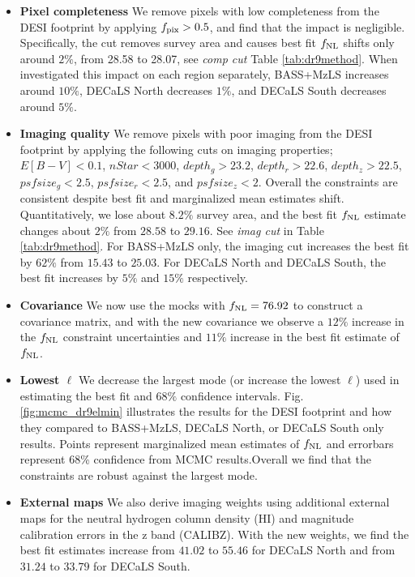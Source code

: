 \begin{itemize}
\item \textbf{Pixel completeness}
We remove pixels with low completeness from the DESI footprint by applying $f_{\rm pix}>0.5$, and find that the impact is negligible. Specifically, the cut removes  survey area and causes best fit $f_{\rm NL}$ shifts only around $2\%$, from 28.58 to 28.07, see \textit{comp cut} Table \ref{tab:dr9method}. When investigated this impact on each region separately, BASS+MzLS increases around $10\%$, DECaLS North decreases $1\%$, and DECaLS South decreases around $5\%$.

\item \textbf{Imaging quality}
We remove pixels with poor imaging from the DESI footprint by applying the following cuts on imaging properties; $E[B-V]<0.1$, $nStar < 3000$, $depth_{g} > 23.2$, $depth_{r} > 22.6$, $depth_{z} > 22.5$, $psfsize_{g}<2.5$, $psfsize_{r}<2.5$, and $psfsize_{z}<2$. Overall the constraints are consistent despite best fit and marginalized mean estimates shift. Quantitatively, we lose about $8.2\%$ survey area, and the best fit $f_{\rm NL}$ estimate changes about $2\%$ from $28.58$ to $29.16$. See \textit{imag cut} in Table \ref{tab:dr9method}. For BASS+MzLS only, the imaging cut increases the best fit by $62\%$ from $15.43$ to $25.03$. For DECaLS North and DECaLS South, the best fit increases by $5\%$ and $15\%$ respectively.

\item \textbf{Covariance}
We now use the mocks with $f_{\rm NL}=76.92$ to construct a covariance matrix, and with the new covariance we observe a $12\%$ increase in the $f_{\rm NL}$ constraint uncertainties and $11\%$ increase in the best fit estimate of $f_{\rm NL}$.

\item \textbf{Lowest $\ell$} 
We decrease the largest mode (or increase the lowest $\ell$) used in estimating the best fit and $68\%$ confidence intervals. Fig. \ref{fig:mcmc_dr9elmin} illustrates the results for the DESI footprint and how they compared to BASS+MzLS, DECaLS North, or DECaLS South only results. Points represent marginalized mean estimates of $f_{\rm NL}$ and errorbars represent $68$\% confidence from MCMC results.Overall we find that the constraints are robust against the largest mode.

\item \textbf{External maps} We also derive imaging weights using additional external maps for the neutral hydrogen column density (HI) and magnitude calibration errors in the z band (CALIBZ). With the new weights, we find the best fit estimates increase from $41.02$ to $55.46$ for DECaLS North and from $31.24$ to $33.79$ for DECaLS South.


\end{itemize}
